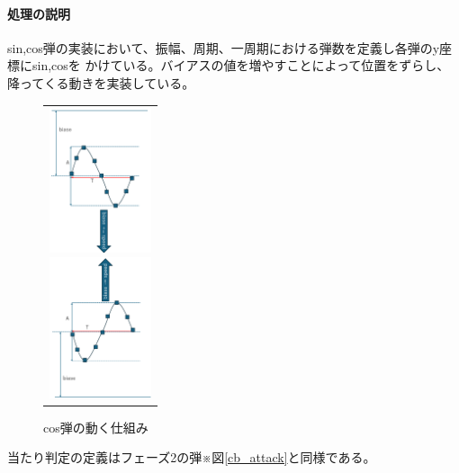 \documentclass[a4paper,titlepage,11pt]{ltjsarticle}
\begin{document}
\paragraph{処理の説明}
sin,cos弾の実装において、振幅、周期、一周期における弾数を定義し各弾のy座標にsin,cosを
かけている。バイアスの値を増やすことによって位置をずらし、降ってくる動きを実装している。
\begin{figure}[H]
\begin{center}
\begin{tabular}{c}
\begin{minipage}{0.5\hsize}
\begin{center}
\includegraphics[width=3cm]{sinb.png}
\end{center}
\caption{sin弾の動く仕組み}
\label{}
\end{minipage}
\begin{minipage}{0.5\hsize}
\begin{center}
\includegraphics[width=3cm]{cosb.png}
\end{center}
\caption{cos弾の動く仕組み}
\label{}
\end{minipage}
\end{tabular}
\end{center}
\end{figure}
当たり判定の定義はフェーズ2の弾※図\ref{cb_attack}と同様である。
\end{document}
